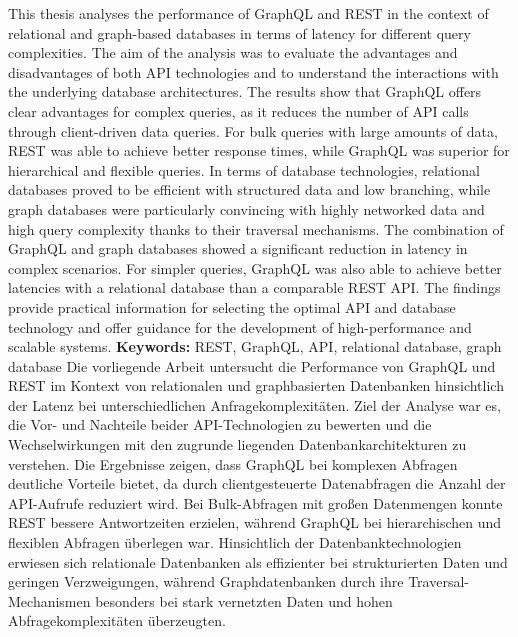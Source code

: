 \label{sec:abstract}
This thesis analyses the performance of GraphQL and REST in the context of relational and graph-based databases in terms of latency for different query complexities. The aim of the analysis was to evaluate the advantages and disadvantages of both API technologies and to understand the interactions with the underlying database architectures.
\newline
\noindent
The results show that GraphQL offers clear advantages for complex queries, as it reduces the number of API calls through client-driven data queries.
For bulk queries with large amounts of data, REST was able to achieve better response times, while GraphQL was superior for hierarchical and flexible queries.
In terms of database technologies, relational databases proved to be efficient with structured data and low branching, while graph databases were particularly convincing with highly networked data and high query complexity thanks to their traversal mechanisms.
\newline
\noindent
The combination of GraphQL and graph databases showed a significant reduction in latency in complex scenarios. For simpler queries, GraphQL was also able to achieve better latencies with a relational database than a comparable REST API. The findings provide practical information for selecting the optimal API and database technology and offer guidance for the development of high-performance and scalable systems.
\newline
\noindent
\textbf{Keywords:} REST, GraphQL, API, relational database, graph database
\newpage
{} %
\label{sec:zusammenfassung}
Die vorliegende Arbeit untersucht die Performance von GraphQL und REST im Kontext von relationalen und graphbasierten Datenbanken hinsichtlich der Latenz bei unterschiedlichen Anfragekomplexitäten. Ziel der Analyse war es, die Vor- und Nachteile beider API-Technologien zu bewerten und die Wechselwirkungen mit den zugrunde liegenden Datenbankarchitekturen zu verstehen.
\newline
\noindent
Die Ergebnisse zeigen, dass GraphQL bei komplexen Abfragen deutliche Vorteile bietet, da durch clientgesteuerte Datenabfragen die Anzahl der API-Aufrufe reduziert wird.
Bei Bulk-Abfragen mit großen Datenmengen konnte REST bessere Antwortzeiten erzielen, während GraphQL bei hierarchischen und flexiblen Abfragen überlegen war.
Hinsichtlich der Datenbanktechnologien erwiesen sich relationale Datenbanken als effizienter bei strukturierten Daten und geringen Verzweigungen, während Graphdatenbanken durch ihre Traversal-Mechanismen besonders bei stark vernetzten Daten und hohen Abfragekomplexitäten überzeugten.

